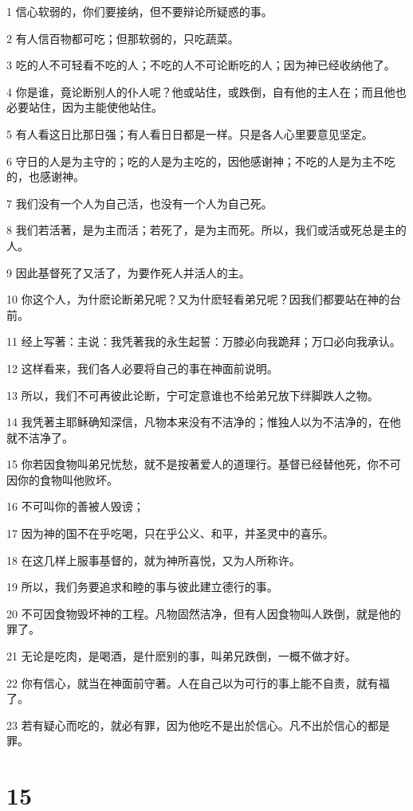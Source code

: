 \par 1 信心软弱的，你们要接纳，但不要辩论所疑惑的事。
\par 2 有人信百物都可吃；但那软弱的，只吃蔬菜。
\par 3 吃的人不可轻看不吃的人；不吃的人不可论断吃的人；因为神已经收纳他了。
\par 4 你是谁，竟论断别人的仆人呢？他或站住，或跌倒，自有他的主人在；而且他也必要站住，因为主能使他站住。
\par 5 有人看这日比那日强；有人看日日都是一样。只是各人心里要意见坚定。
\par 6 守日的人是为主守的；吃的人是为主吃的，因他感谢神；不吃的人是为主不吃的，也感谢神。
\par 7 我们没有一个人为自己活，也没有一个人为自己死。
\par 8 我们若活著，是为主而活；若死了，是为主而死。所以，我们或活或死总是主的人。
\par 9 因此基督死了又活了，为要作死人并活人的主。
\par 10 你这个人，为什麽论断弟兄呢？又为什麽轻看弟兄呢？因我们都要站在神的台前。
\par 11 经上写著：主说：我凭著我的永生起誓：万膝必向我跪拜；万口必向我承认。
\par 12 这样看来，我们各人必要将自己的事在神面前说明。
\par 13 所以，我们不可再彼此论断，宁可定意谁也不给弟兄放下绊脚跌人之物。
\par 14 我凭著主耶稣确知深信，凡物本来没有不洁净的；惟独人以为不洁净的，在他就不洁净了。
\par 15 你若因食物叫弟兄忧愁，就不是按著爱人的道理行。基督已经替他死，你不可因你的食物叫他败坏。
\par 16 不可叫你的善被人毁谤；
\par 17 因为神的国不在乎吃喝，只在乎公义、和平，并圣灵中的喜乐。
\par 18 在这几样上服事基督的，就为神所喜悦，又为人所称许。
\par 19 所以，我们务要追求和睦的事与彼此建立德行的事。
\par 20 不可因食物毁坏神的工程。凡物固然洁净，但有人因食物叫人跌倒，就是他的罪了。
\par 21 无论是吃肉，是喝酒，是什麽别的事，叫弟兄跌倒，一概不做才好。
\par 22 你有信心，就当在神面前守著。人在自己以为可行的事上能不自责，就有福了。
\par 23 若有疑心而吃的，就必有罪，因为他吃不是出於信心。凡不出於信心的都是罪。

\chapter{15}

